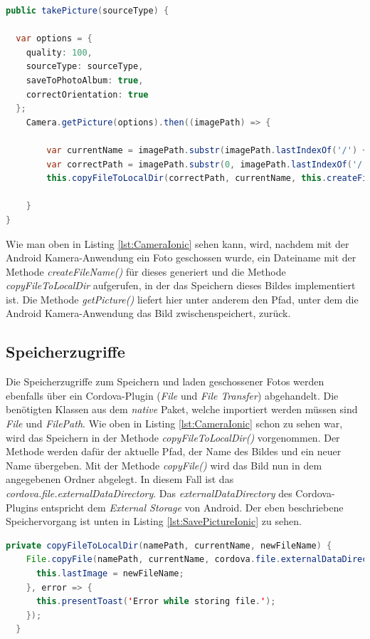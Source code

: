 \begin{lstlisting}[caption=Aufruf der Android Kamera-Anwendung über die Methode \textit{getPicture()}, label=lst:CameraIonic, language=Java]
public takePicture(sourceType) {
  
  var options = {
    quality: 100,
    sourceType: sourceType,
    saveToPhotoAlbum: true,
    correctOrientation: true
  };
	Camera.getPicture(options).then((imagePath) => {
      
        var currentName = imagePath.substr(imagePath.lastIndexOf('/') + 1);
        var correctPath = imagePath.substr(0, imagePath.lastIndexOf('/') + 1);
        this.copyFileToLocalDir(correctPath, currentName, this.createFileName());
      
    }
}
\end{lstlisting}

Wie man oben in Listing \ref{lst:CameraIonic} sehen kann, wird, nachdem mit der Android Kamera-Anwendung ein Foto geschossen wurde, ein Dateiname mit der Methode \textit{createFileName()} für dieses generiert und die Methode \textit{copyFileToLocalDir} aufgerufen, in der das Speichern dieses Bildes implementiert ist. Die Methode \textit{getPicture()} liefert hier unter anderem den Pfad, unter dem die Android Kamera-Anwendung das Bild zwischenspeichert, zurück.

\subsection*{Speicherzugriffe}

Die Speicherzugriffe zum Speichern und laden geschossener Fotos werden ebenfalls über ein Cordova-Plugin (\textit{File} und \textit{File Transfer}) abgehandelt. Die benötigten Klassen aus dem \textit{native} Paket, welche importiert werden müssen sind \textit{File} und \textit{FilePath}. Wie oben in Listing \ref{lst:CameraIonic} schon zu sehen war, wird das Speichern in der Methode \textit{copyFileToLocalDir()} vorgenommen. Der Methode werden dafür der aktuelle Pfad, der Name des Bildes und ein neuer Name übergeben. Mit der Methode \textit{copyFile()} wird das Bild nun in dem angegebenen Ordner abgelegt. In diesem Fall ist das \textit{cordova.file.externalDataDirectory}. Das \textit{externalDataDirectory} des Cordova-Plugins entspricht dem \textit{External Storage} von Android. Der eben beschriebene Speichervorgang ist unten in Listing \ref{lst:SavePictureIonic} zu sehen. 
\clearpage

\begin{lstlisting}[caption=Methode \textit{copyFileToLocalDir()} zum Speichern der aufgenommenen Bilder, label=lst:SavePictureIonic, language=Java]
private copyFileToLocalDir(namePath, currentName, newFileName) {
    File.copyFile(namePath, currentName, cordova.file.externalDataDirectory, newFileName).then(success => {
      this.lastImage = newFileName;
    }, error => {
      this.presentToast('Error while storing file.');
    });
  }
\end{lstlisting}


